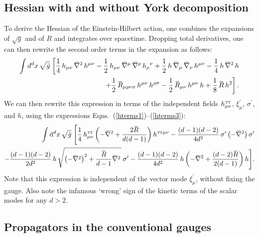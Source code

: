 \documentclass[11pt]{book}
\newcommand{\overbar}[1]{\mkern 1.5mu\overline{\mkern-1.5mu#1\mkern-1.5mu}\mkern 1.5mu}
\newcommand\TTspace{ -1pt }
\newcommand\TT{ \scriptscriptstyle{\mathrm{T\hspace{\TTspace}T}} }
\newcommand\hTTmunu{ h^{\scriptscriptstyle{\mathrm{T\hspace{\TTspace}T}}}_{\mu\nu} }
\newcommand{\bnabla}{\overbar \nabla}
\newcommand{\bR}{\overbar R}
\numberwithin{equation}{chapter}
\begin{document}
\begin{appendices}
\subsection{Hessian with and without York decomposition}

To derive the Hessian of the Einstein-Hilbert action,
one combines the expansions of $\sqrt{g}$ and of $R$
and integrates over spacetime.
Dropping total derivatives, one can then rewrite the second order
terms in the expansion as follows:
\begin{align}
  \int d^dx \, \sqrt{\bar g} \;
  \bigg[
    \frac{1}{4} \, h_{\mu\nu} \, \bnabla^2 \, h^{\mu\nu}
    - \frac{1}{2} \, h_{\mu\nu} \, \bnabla^\mu \, \bnabla^\rho \, h_\rho{}^\nu
    + \frac{1}{2} \, h \, \bnabla_\mu \, \bnabla_\nu \, h^{\mu\nu}
    - \frac{1}{4} \, h \, \bnabla^2 \, h
    \nonumber \\
    + \frac{1}{2} \, \bR_{\mu\rho\nu\sigma} \, h^{\mu\nu} \, h^{\rho\sigma}
    - \frac{1}{2} \, \bR_{\mu\nu} \, h^{\mu\nu} \, h
    + \frac{1}{8} \, \bR \, h^2
  \bigg] \,.
\end{align}
We can then rewrite this expression in terms of the independent fields
$\hTTmunu$, $\xi^\prime_\mu$, $\sigma^\prime$, and $h$,
using the expressions Eqns.~(\ref{hterms1})--(\ref{hterms3}):
\begin{align}
  \int \mathrm d^dx \, \sqrt{\bar g} \;
  \Bigg[
    \frac{1}{4} \, \hTTmunu
    \left(
      -\bnabla^2 + \frac{2\bR}{d(d-1)}
    \right)
    h^{{\TT} \mu\nu}
    - \frac{(d-1)(d-2)}{4d^2} \, \sigma'
    \left( -\bnabla^2 \right)
    \sigma'
    \nonumber \\
    - \frac{(d-1)(d-2)}{2d^2} \,
  h \, \sqrt{\left( -\bnabla^2 \right)^2 + \frac{\bR}{d-1} \bnabla^2 \, } \, \sigma'
  - \frac{(d-1)(d-2)}{4d^2} \, h \left( -\bnabla^2 + \frac{(d-2)\bR}{2(d-1)} \right) h
  \Bigg] .
\end{align}
Note that this expression is independent of the vector mode $\xi^\prime_\mu$,
without fixing the gauge. Also note the infamous `wrong' sign of the kinetic terms of
the scalar modes for any $d>2$.

\subsection{Propagators in the conventional gauges}


\end{appendices}
\end{document}
